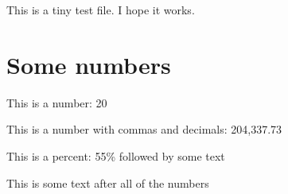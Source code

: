 \documentclass[12pt]{article}
\begin{document}
This is a tiny test file. I hope it works.

\section{Some numbers}

This is a number: 20

This is a number with commas and decimals: 204,337.73

This is a percent: 55\% followed by some text

This is some text after all of the numbers
\end{document}
